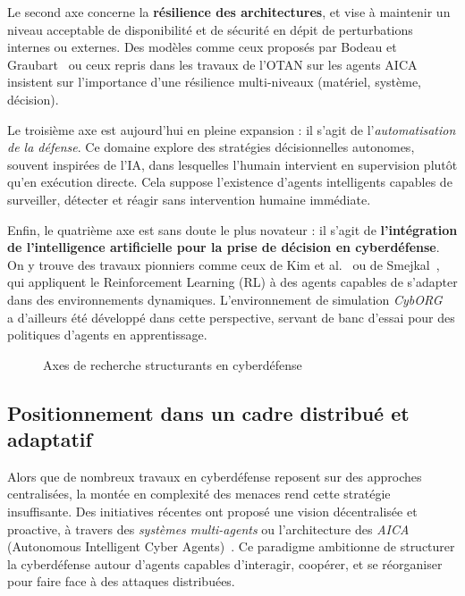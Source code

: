 \documentclass[ twoside,openright,titlepage,numbers=noenddot,headinclude,%
                footinclude=true,cleardoublepage=empty,abstractoff, %
                BCOR=5mm,paper=a4,fontsize=11pt,%
                french,american,%
                ]{scrreprt}
\begin{document}
Le second axe concerne la \textbf{résilience des architectures}, et vise à maintenir un niveau acceptable de disponibilité et de sécurité en dépit de perturbations internes ou externes. Des modèles comme ceux proposés par Bodeau et Graubart~\cite{bodeau2011} ou ceux repris dans les travaux de l'OTAN sur les agents AICA~\cite{aica2021} insistent sur l'importance d'une résilience multi-niveaux (matériel, système, décision).

Le troisième axe est aujourd'hui en pleine expansion : il s'agit de l'\emph{automatisation de la défense}. Ce domaine explore des stratégies décisionnelles autonomes, souvent inspirées de l'IA, dans lesquelles l'humain intervient en supervision plutôt qu'en exécution directe. Cela suppose l'existence d'agents intelligents capables de surveiller, détecter et réagir sans intervention humaine immédiate.

Enfin, le quatrième axe est sans doute le plus novateur : il s'agit de \textbf{l'intégration de l'intelligence artificielle pour la prise de décision en cyberdéfense}. On y trouve des travaux pionniers comme ceux de Kim et al.~\cite{kim2021} ou de Smejkal~\cite{smejkal2021}, qui appliquent le Reinforcement Learning (RL) à des agents capables de s'adapter dans des environnements dynamiques. L'environnement de simulation \emph{CybORG}~\cite{cyborg2021} a d'ailleurs été développé dans cette perspective, servant de banc d'essai pour des politiques d'agents en apprentissage.

\begin{figure}[h]
    \centering
    \caption{Axes de recherche structurants en cyberdéfense}
    \label{fig:cyberdefense_axes}
\end{figure}

\subsection*{Positionnement dans un cadre distribué et adaptatif}

Alors que de nombreux travaux en cyberdéfense reposent sur des approches centralisées, la montée en complexité des menaces rend cette stratégie insuffisante. Des initiatives récentes ont proposé une vision décentralisée et proactive, à travers des \emph{systèmes multi-agents} ou l'architecture des \emph{AICA} (Autonomous Intelligent Cyber Agents)~\cite{aicaguide2022}. Ce paradigme ambitionne de structurer la cyberdéfense autour d'agents capables d'interagir, coopérer, et se réorganiser pour faire face à des attaques distribuées.
\end{document}
